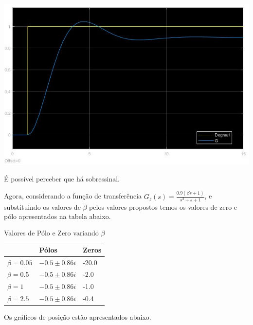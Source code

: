 \documentclass[
]{book}
\theoremstyle{definition}
\theoremstyle{definition}
\theoremstyle{definition}
\theoremstyle{remark}
\begin{document}
\includegraphics{imagens/Lab2/prob5Sim.jpg}

É possível perceber que há sobressinal.

Agora, considerando a função de transferência \(G_z(s) = \frac {0.9(\beta s+1)}{s^2+s+1}\), e substituindo os valores de \(\beta\) pelos valores propostos temos os valores de zero e pólo apresentados na tabela abaixo.

\begin{table}

\caption{\label{tab:unnamed-chunk-7}Valores de Pólo e Zero variando $\beta$}
\centering
\begin{tabular}[t]{lll}
\toprule
  & Pólos & Zeros\\
\midrule
$\beta = 0.05$ & {$-0.5 \pm 0.86i$} & -20.0\\
$\beta = 0.5$ & {$-0.5 \pm 0.86i$} & -2.0\\
$\beta = 1$ & {$-0.5 \pm 0.86i$} & -1.0\\
$\beta = 2.5$ & {$-0.5 \pm 0.86i$} & -0.4\\
\bottomrule
\end{tabular}
\end{table}

Os gráficos de posição estão apresentados abaixo.
\end{document}
